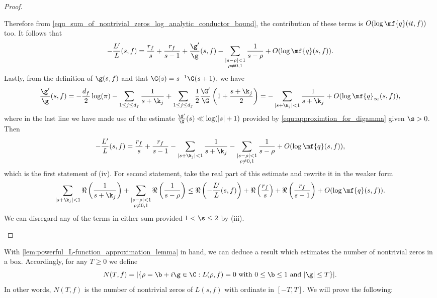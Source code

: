 \begin{proof}
\begin{enumerate}[label=(\roman*)]
\[        \]
        Therefore from \cref{equ_sum_of_nontrivial_zeros_log_analytic_conductor_bound}, the contribution of these terms is $O(\log{\mf{q}(it,f)})$ too. It follows that
        \[
          -\frac{L'}{L}(s,f) = \frac{r_{f}}{s}+\frac{r_{f}}{s-1}+\frac{\g'}{\g}(s,f)-\sum_{\substack{|s-\rho| < 1 \\ \rho \neq 0,1}}\frac{1}{s-\rho}+O(\log{\mf{q}(s,f)}).
        \]
        Lastly, from the definition of $\g(s,f)$ and that $\G(s) = s^{-1}\G(s+1)$, we have
        \[
          \frac{\g'}{\g}(s,f) = -\frac{d_{f}}{2}\log(\pi)-\sum_{1 \le j \le d_{f}}\frac{1}{s+\k_{j}}+\sum_{1 \le j \le d_{f}}\frac{1}{2}\frac{\G'}{\G}\left(1+\frac{s+\k_{j}}{2}\right) = -\sum_{|s+\k_{j}| < 1}\frac{1}{s+\k_{j}}+O(\log{\mf{q}_{\infty}(s,f)}),
        \]
        where in the last line we have made use of the estimate $\frac{\G'}{\G}(s) \ll \log(|s|+1)$ provided by \cref{equ:approximtion_for_digamma} given $\s > 0$. Then
        \[
          -\frac{L'}{L}(s,f) = \frac{r_{f}}{s}+\frac{r_{f}}{s-1}-\sum_{|s+\k_{j}| < 1}\frac{1}{s+\k_{j}}-\sum_{\substack{|s-\rho| < 1 \\ \rho \neq 0,1}}\frac{1}{s-\rho}+O(\log{\mf{q}(s,f)}),
        \]
        which is the first statement of (iv). For second statement, take the real part of this estimate and rewrite it in the weaker form
        \[
          \sum_{|s+\k_{j}| < 1}\Re\left(\frac{1}{s+\k_{j}}\right)+\sum_{\substack{|s-\rho| < 1 \\ \rho \neq 0,1}}\Re\left(\frac{1}{s-\rho}\right) \le \Re\left(-\frac{L'}{L}(s,f)\right)+\Re\left(\frac{r_{f}}{s}\right)+\Re\left(\frac{r_{f}}{s-1}\right)+O(\log{\mf{q}(s,f)}).
        \]
        We can disregard any of the terms in either sum provided $1 < \s \le 2$ by (iii).
      \end{enumerate}
    \end{proof}

    With \cref{lem:powerful_L-function_approximation_lemma} in hand, we can deduce a result which estimates the number of nontrivial zeros in a box. Accordingly, for any $T \ge 0$ we define
    \[
      N(T,f) = |\{\rho = \b+i\g \in \C:\text{$L(\rho,f) = 0$ with $0 \le \b \le 1$ and $|\g| \le T$}\}|.
    \]
    In other words, $N(T,f)$ is the number of nontrivial zeros of $L(s,f)$ with ordinate in $[-T,T]$. We will prove the following:

